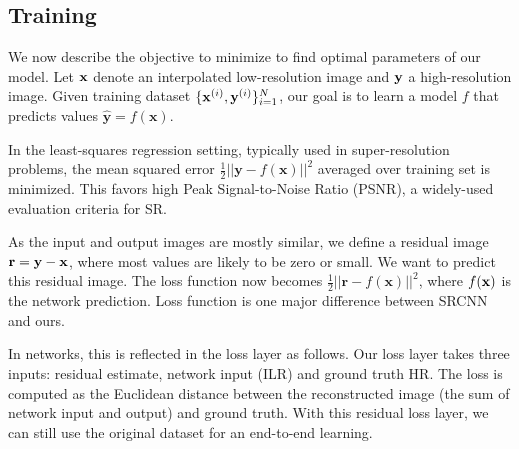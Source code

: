 \documentclass[10pt,twocolumn,letterpaper]{article}
\begin{document}
\subsection{Training}

We now describe the objective to minimize to find optimal parameters of our model. Let ${\bf x}$ denote an interpolated low-resolution image and ${\bf y}$ a high-resolution image. 
Given training dataset $\{{\bf x}^{(i)},{\bf y}^{(i)}\}{}_{i=1}^{N}$, our goal is to learn a model $f$ that predicts values $\mathbf{\hat{y}}=f(\mathbf{x})$.

In the least-squares regression setting, typically used in super-resolution
problems, the mean squared error $\frac{1}{2}||\mathbf{y}-f(\mathbf{x})||^{2}$
averaged over training set is minimized. This favors high Peak Signal-to-Noise
Ratio (PSNR), a widely-used evaluation criteria for SR. 

As the input and output images are mostly similar, we define a residual image ${\bf r}={\bf y}-{\bf x}$, where most values are likely to be zero or small. We want to predict this residual image. The loss function now becomes $\frac{1}{2}||\mathbf{r}-f(\mathbf{x})||^{2}$, where $f(\bf{x})$ is the network prediction. Loss function is one major difference between SRCNN and ours. 

In networks, this is reflected in the loss layer as follows. 
Our loss layer takes three inputs: residual estimate, network input (ILR) and ground truth HR. The loss is computed as the Euclidean distance between the reconstructed image (the sum of network input and output) and ground truth. With this residual loss layer, we can still use the original dataset for an end-to-end learning.
\end{document}
